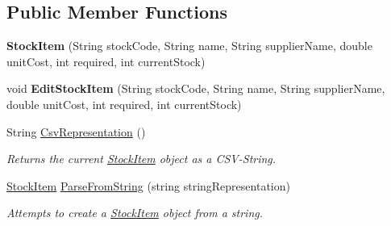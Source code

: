 \subsection*{Public Member Functions}
\begin{DoxyCompactItemize}
\item 
\hypertarget{class_application_logic_1_1_model_1_1_stock_item_a1a0d82de69fc9490ce2354ee4cdcd68c}{
{\bfseries StockItem} (String stockCode, String name, String supplierName, double unitCost, int required, int currentStock)}
\label{class_application_logic_1_1_model_1_1_stock_item_a1a0d82de69fc9490ce2354ee4cdcd68c}

\item 
\hypertarget{class_application_logic_1_1_model_1_1_stock_item_ab1fd8e042a5b65bc7a3524e867431b80}{
void {\bfseries EditStockItem} (String stockCode, String name, String supplierName, double unitCost, int required, int currentStock)}
\label{class_application_logic_1_1_model_1_1_stock_item_ab1fd8e042a5b65bc7a3524e867431b80}

\item 
String \hyperlink{class_application_logic_1_1_model_1_1_stock_item_ae274928bf9b87a0be6ab5bf1d59daa12}{CsvRepresentation} ()
\begin{DoxyCompactList}\small\item\em Returns the current \hyperlink{class_application_logic_1_1_model_1_1_stock_item}{StockItem} object as a CSV-\/String. \item\end{DoxyCompactList}\item 
\hyperlink{class_application_logic_1_1_model_1_1_stock_item}{StockItem} \hyperlink{class_application_logic_1_1_model_1_1_stock_item_a04fe347e073b0c6472ed0d7d5e41b0fa}{ParseFromString} (string stringRepresentation)
\begin{DoxyCompactList}\small\item\em Attempts to create a \hyperlink{class_application_logic_1_1_model_1_1_stock_item}{StockItem} object from a string. \item\end{DoxyCompactList}\end{DoxyCompactItemize}
